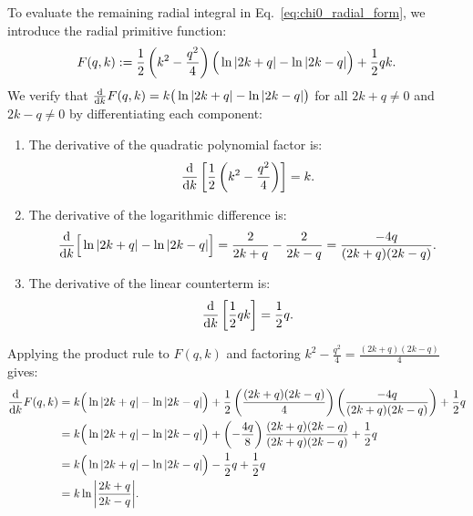 \documentclass[11pt, a4paper]{article}
\numberwithin{equation}{section}
\begin{document}
To evaluate the remaining radial integral in Eq.~\eqref{eq:chi0_radial_form}, we introduce the radial primitive function:
\begin{equation}\label{eq:radial_primitive}
  F(q, k) := \frac{1}{2}\left(k^2 - \frac{q^2}{4}\right) \Big( \ln\abs{2k + q} - \ln\abs{2k - q} \Big) + \frac{1}{2} q k.
\end{equation}
We verify that $\dv{k} F(q, k) = k \big(\ln\abs{2k + q} - \ln\abs{2k - q}\big)$ for all $2k + q \neq 0$ and $2k - q \neq 0$ by differentiating each component:
\begin{enumerate}
  \item The derivative of the quadratic polynomial factor is:
    \begin{equation}
      \dv{k}\left[ \frac{1}{2}\left(k^2 - \frac{q^2}{4}\right) \right] = k.
    \end{equation}
  \item The derivative of the logarithmic difference is:
    \begin{equation}
      \dv{k}\Big[ \ln\abs{2k + q} - \ln\abs{2k - q} \Big]
      = \frac{2}{2k + q} - \frac{2}{2k - q}
      = \frac{-4q}{(2k + q)(2k - q)}.
    \end{equation}
  \item The derivative of the linear counterterm is:
    \begin{equation}
      \dv{k}\left[ \frac{1}{2} q k \right] = \frac{1}{2} q.
    \end{equation}
\end{enumerate}
Applying the product rule to $F(q, k)$ and factoring $k^2 - \frac{q^2}{4} = \frac{(2k + q)(2k - q)}{4}$ gives:
\begin{align}\label{eq:antideriv_trick}
  \dv{k} F(q, k)
  &= k \Big( \ln\abs{2k + q} - \ln\abs{2k - q} \Big)
     + \frac{1}{2}\left( \frac{(2k + q)(2k - q)}{4} \right) \left( \frac{-4q}{(2k + q)(2k - q)} \right) + \frac{1}{2} q \nonumber \\
  &= k \Big( \ln\abs{2k + q} - \ln\abs{2k - q} \Big)
     + \left( -\frac{4q}{8} \right) \frac{(2k + q)(2k - q)}{(2k + q)(2k - q)} + \frac{1}{2} q \nonumber \\
  &= k \Big( \ln\abs{2k + q} - \ln\abs{2k - q} \Big) - \frac{1}{2} q + \frac{1}{2} q \nonumber \\
  &= k \ln\abs{\frac{2k + q}{2k - q}}.
\end{align}
\end{document}
